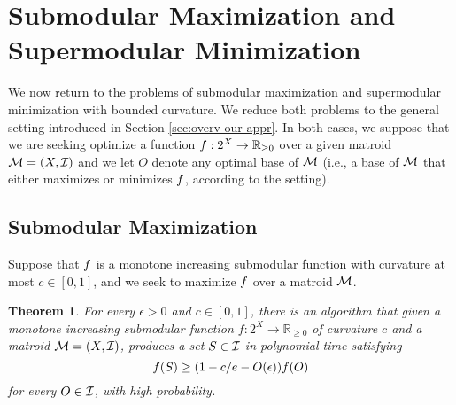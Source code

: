 \documentclass{article}
\newcommand{\reals}{\ensuremath{\mathbb{R}}}
\newcommand{\posreals}{\ensuremath{\reals_{\ge 0}}}
\newtheorem{theorem}{Theorem}[section]
\theoremstyle{definition}
\begin{document}
\section{Submodular Maximization and Supermodular Minimization}
\label{sec:applications}
We now return to the problems of submodular maximization and supermodular minimization with bounded curvature.  We reduce both problems to the general setting introduced in Section \ref{sec:overv-our-appr}.  In both cases, we suppose that we are seeking optimize a function $\obj : 2^{\ground} \to \posreals$ over a given matroid $\mathcal{M} = (X,\mathcal{I})$ and we let $O$ denote any optimal base of $\mathcal{M}$ (i.e., a base of $\mathcal{M}$ that either maximizes or minimizes $f$, according to the setting).

\subsection{Submodular Maximization}
\label{sec:subm-maxim}

Suppose that $f$ is a monotone increasing submodular function with curvature at most $c \in [0,1]$, and we seek to maximize $f$ over a matroid $\mathcal{M}$. 

\begin{theorem}
\label{thm:submod-main}
For every $\epsilon > 0$ and $c \in [0,1]$, there is an algorithm that given a monotone increasing submodular function $f:2^X \rightarrow \posreals$ of curvature $c$ and a matroid $\mathcal{M} = (X,\mathcal{I})$, produces a set $S \in \mathcal{I}$ in polynomial time satisfying
\begin{equation*}
f(S) \geq (1 - c/e - O(\epsilon)) f(O)
\end{equation*}
for every $O \in \mathcal{I}$, with high probability.
\end{theorem}
\end{document}
